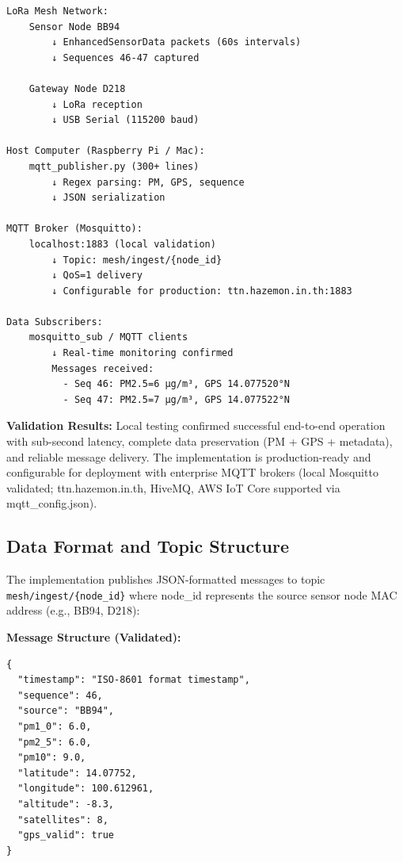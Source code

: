 \begin{verbatim}
LoRa Mesh Network:
    Sensor Node BB94
        ↓ EnhancedSensorData packets (60s intervals)
        ↓ Sequences 46-47 captured

    Gateway Node D218
        ↓ LoRa reception
        ↓ USB Serial (115200 baud)

Host Computer (Raspberry Pi / Mac):
    mqtt_publisher.py (300+ lines)
        ↓ Regex parsing: PM, GPS, sequence
        ↓ JSON serialization

MQTT Broker (Mosquitto):
    localhost:1883 (local validation)
        ↓ Topic: mesh/ingest/{node_id}
        ↓ QoS=1 delivery
        ↓ Configurable for production: ttn.hazemon.in.th:1883

Data Subscribers:
    mosquitto_sub / MQTT clients
        ↓ Real-time monitoring confirmed
        Messages received:
          - Seq 46: PM2.5=6 µg/m³, GPS 14.077520°N
          - Seq 47: PM2.5=7 µg/m³, GPS 14.077522°N
\end{verbatim}

\textbf{Validation Results:} Local testing confirmed successful end-to-end operation with sub-second latency, complete data preservation (PM + GPS + metadata), and reliable message delivery. The implementation is production-ready and configurable for deployment with enterprise MQTT brokers (local Mosquitto validated; ttn.hazemon.in.th, HiveMQ, AWS IoT Core supported via mqtt\_config.json).

\subsection{Data Format and Topic Structure}

The implementation publishes JSON-formatted messages to topic \texttt{mesh/ingest/\{node\_id\}} where node\_id represents the source sensor node MAC address (e.g., BB94, D218):

\textbf{Message Structure (Validated):}
\begin{verbatim}
{
  "timestamp": "ISO-8601 format timestamp",
  "sequence": 46,
  "source": "BB94",
  "pm1_0": 6.0,
  "pm2_5": 6.0,
  "pm10": 9.0,
  "latitude": 14.07752,
  "longitude": 100.612961,
  "altitude": -8.3,
  "satellites": 8,
  "gps_valid": true
}
\end{verbatim}


